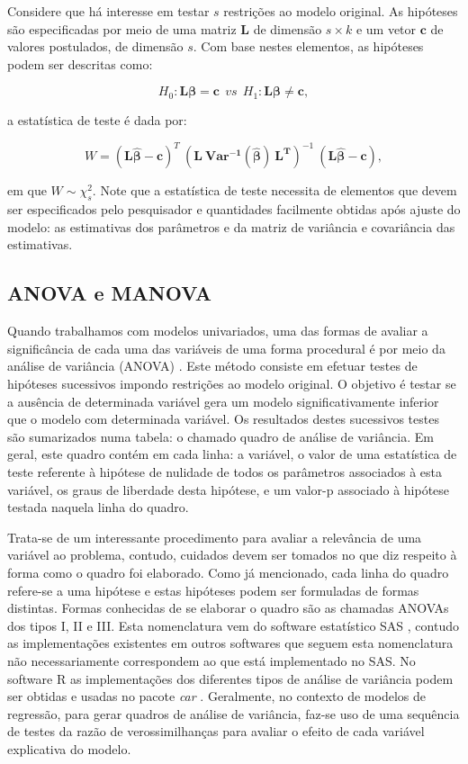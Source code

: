 Considere que há interesse em testar $s$ restrições ao modelo original. As hipóteses são especificadas por meio de uma matriz $\boldsymbol{L}$ de dimensão $s \times k$ e um vetor $\boldsymbol{c}$ de valores postulados, de dimensão $s$. Com base nestes elementos, as hipóteses podem ser descritas como:

$$
H_0: \boldsymbol{L}\boldsymbol{\beta} = \boldsymbol{c} \: \:  vs \: \:  H_1: \boldsymbol{L}\boldsymbol{\beta} \neq \boldsymbol{c},
$$

\noindent a estatística de teste é dada por:

$$
W = (\boldsymbol{L\hat\beta} - \boldsymbol{c})^T \ (\boldsymbol{L \ Var^{-1}(\hat\beta) \ L^T})^{-1} \ (\boldsymbol{L\hat\beta} - \boldsymbol{c}),
$$

\noindent em que $W \sim \chi^2_s$. Note que a estatística de teste necessita de elementos que devem ser especificados pelo pesquisador e quantidades facilmente obtidas após ajuste do modelo: as estimativas dos parâmetros e da matriz de variância e covariância das estimativas.

\subsection{ANOVA e MANOVA}

Quando trabalhamos com modelos univariados, uma das formas de avaliar a significância de cada uma das variáveis de uma forma procedural é por meio da análise de variância (ANOVA) \citep{anova_fisher}. Este método consiste em efetuar testes de hipóteses sucessivos impondo restrições ao modelo original. O objetivo é testar se a ausência de determinada variável gera um modelo significativamente inferior que o modelo com determinada variável. Os resultados destes sucessivos testes são sumarizados numa tabela: o chamado quadro de análise de variância. Em geral, este quadro contém em cada linha: a variável, o valor de uma estatística de teste referente à hipótese de nulidade de todos os parâmetros associados à esta variável, os graus de liberdade desta hipótese, e um valor-p associado à hipótese testada naquela linha do quadro.

Trata-se de um interessante procedimento para avaliar a relevância de uma variável ao problema, contudo, cuidados devem ser tomados no que diz respeito à forma como o quadro foi elaborado. Como já mencionado, cada linha do quadro refere-se a uma hipótese e estas hipóteses podem ser formuladas de formas distintas. Formas conhecidas de se elaborar o quadro são as chamadas ANOVAs dos tipos I, II e III. Esta nomenclatura vem do software estatístico SAS \citep{sas}, contudo as implementações existentes em outros softwares que seguem esta nomenclatura não necessariamente correspondem ao que está implementado no SAS. No software R \citep{softwareR} as implementações dos diferentes tipos de análise de variância podem ser obtidas e usadas no pacote \emph{car} \citep{car}. Geralmente, no contexto de modelos de regressão, para gerar quadros de análise de variância, faz-se uso de uma sequência de testes da razão de verossimilhanças para avaliar o efeito de cada variável explicativa do modelo. 

